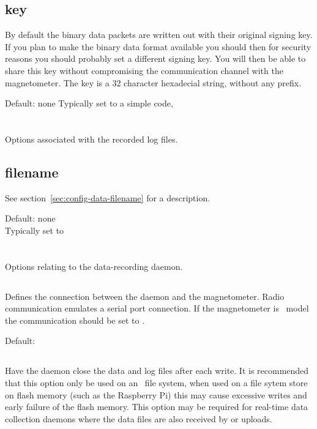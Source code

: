 \subsection{key}
By default the binary data packets are written out with their original
signing key. If you plan to make the binary data format available you
should then for security reasons you should probably set a different
signing key. You will then be able to share this key without
compromising the communication channel with the magnetometer. The key
is a 32 character hexadecial string, without any  prefix.

Default: none
Typically set to a simple code, 

\section{\code{[logfile]}}
Options associated with the recorded log files. 

\subsection{filename}

See section~\ref{sec:config-data-filename} for a description.

Default: none\\
Typically set to 


\section{\code[daemon]}
Options relating to the data-recording daemon.

\subsection{}
Defines the connection between the daemon and the magnetometer. Radio
communication emulates a serial port connection. If the magnetometer
is \PoE\ model the communication should be set to .

Default: 

\subsection{}
Have the daemon close the data and log files after each write. It is
recommended that this option only be used on an \nfs\ file system,
when used on a file sytem store on flash memory (such as the Raspberry
Pi) this may cause excessive writes and early failure of the flash
memory. This option may be required for real-time data collection
daemons where the data files are also received by  or
 uploads.

